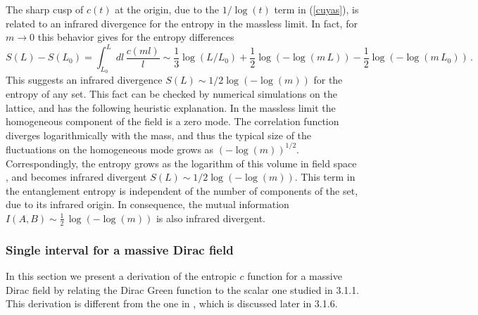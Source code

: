 \documentclass[11pt]{article}
\begin{document}
The sharp cusp of $c(t)$ at the origin, due to the $1/\log(t)$ term in (\ref{cuyas}), is related to an infrared divergence for the entropy in the massless limit. In fact, for $m\rightarrow 0$ this behavior gives for the entropy differences
\begin{equation}
S(L)-S(L_0)=\int_{L_0}^L dl\, \frac{c(m l)}{l}\sim
\frac{1}{3}\log(L/L_0)+\frac{1}{2} \log\left(-\log(m\,L)\right)-\frac{1}{2} \log\left(-\log(m\,L_0)\right)\,.
\end{equation}    
 This suggests an infrared divergence $S(L)\sim 1/2 \log(-\log(m))$ for the entropy of any set. This fact can be checked by numerical simulations on the lattice, and has the following heuristic explanation. In the massless limit the homogeneous component of the field is a zero mode. The correlation function diverges logarithmically with the mass, and thus the typical size of the fluctuations on the homogeneous mode grows as $(-\log (m))^{1/2}$. Correspondingly, the entropy grows as the logarithm of this volume in field space \cite{unruh1}, and    
 becomes infrared divergent $S(L)\sim 1/2\log(-\log(m))$. This term in the entanglement entropy is  independent of the number of components of the set, due to its infrared origin. In consequence, the mutual information $I(A,B)\sim \frac{1}{2}\,\log(-\log(m))$ is also infrared divergent.
 

\subsubsection{Single interval for a massive Dirac field}
In this section we present a derivation of the entropic $c$ function for a massive Dirac field by relating the Dirac Green function to the scalar one studied in 3.1.1. This derivation is different from the one in \cite{fermion}, which is discussed later in 3.1.6.
\end{document}
